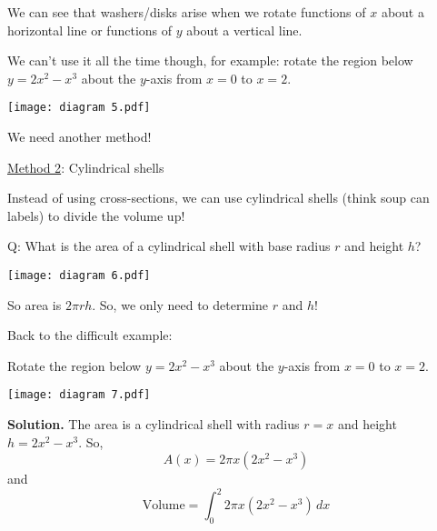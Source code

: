 We can see that washers/disks arise when we rotate functions of $ x $ about
a horizontal line or functions of $ y $ about a vertical line.

We can't use it all the time though, for example: rotate the region below
$ y=2x^2-x^3 $ about the $ y $-axis from $ x=0 $ to $ x=2 $.

\begin{center}
    \texttt{[image: diagram 5.pdf]}
\end{center}

We need another method!

\underline{Method 2}: Cylindrical shells

Instead of using cross-sections, we can use cylindrical shells (think soup can labels)
to divide the volume up!

Q\@: What is the area of a cylindrical shell with base radius $ r $ and height $ h $?

\begin{center}
    \texttt{[image: diagram 6.pdf]}
\end{center}

So area is $ 2\pi rh $. So, we only need to determine $ r $ and $ h $!

Back to the difficult example:
\begin{Example}{}{}
    Rotate the region below $ y=2x^2-x^3 $ about the $ y $-axis from $ x=0 $ to $ x=2 $.
    \begin{center}
        \texttt{[image: diagram 7.pdf]}
    \end{center}
    \textbf{Solution.} The area is a cylindrical shell with radius $ r=x $ and height
    $ h=2x^2-x^3 $. So,
    \[ A(x)=2\pi x\left( 2x^2-x^3 \right) \]
    and
    \[ \text{Volume}=\int_{0}^{2}2\pi x\left( 2x^2-x^3 \right)\, d{x} \]
\end{Example}

